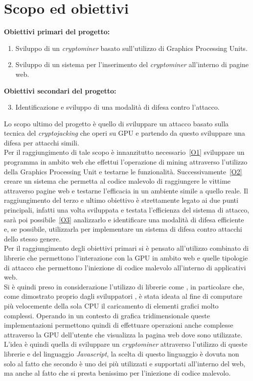 \documentclass[
11pt, %
oneside, %
italian, %
onehalfspacing,%
headsepline, %
]{MastersDoctoralThesis} %
\newcommand\citen[1]{\citeauthor{#1} \citep{#1}}
\begin{document}
{\chapter{Scopo ed obiettivi}}
\textbf{Obiettivi primari del progetto:}
\begin{enumerate}[label= (\roman*)]
        \item\label{O1} Sviluppo di un \emph{cryptominer} basato sull'utilizzo di Graphics Processing Units.
        \item\label{O2} Sviluppo di un sistema per l'inserimento del \emph{cryptominer} all'interno di pagine web.
\end{enumerate}
\textbf{Obiettivi secondari del progetto:}
\begin{enumerate}[label= (\roman*)]
        \setcounter{enumi}{2}
        \item\label{O3} Identificazione e sviluppo di una modalità di difesa contro l'attacco.
\end{enumerate}
Lo scopo ultimo del progetto è quello di sviluppare un attacco basato sulla tecnica del \emph{cryptojacking} che operi su GPU e partendo da questo sviluppare una difesa per attacchi simili.\\
Per il raggiungimento di tale scopo è innanzitutto necessario~\ref{O1} sviluppare un programma in ambito web che effettui l'operazione di mining attraverso l'utilizzo della Graphics Processing Unit e testarne le funzionalità. Successivamente~\ref{O2} creare un sistema che permetta al codice malevolo di raggiungere le vittime attraverso pagine web e testarne l'efficacia in un ambiente simile a quello reale. Il raggiungimento del terzo e ultimo obiettivo è strettamente legato ai due punti principali, infatti una volta sviluppata e testata l'efficienza del sistema di attacco, sarà poi possibile~\ref{O3} analizzarlo e identificare una modalità di difesa efficiente e, se possibile, utilizzarla per implementare un sistema di difesa contro attacchi dello stesso genere.\\
Per il raggiungimento degli obiettivi primari si è pensato all'utilizzo combinato di librerie che permettono l'interazione con la GPU in ambito web e quelle tipologie di attacco che permettono l'iniezione di codice malevolo all'interno di applicativi web.\\
Si è quindi preso in considerazione l'utilizzo di librerie come , in particolare  che, come dimostrato proprio dagli sviluppatori \citep{banchmarkGPU.js}, è stata ideata al fine di computare più velocemente della sola CPU il caricamento di elementi grafici molto complessi. Operando in un contesto di grafica tridimensionale queste implementazioni permettono quindi di effettuare operazioni anche complesse attraverso la GPU dell'utente che visualizza la pagina web dove sono utilizzate. L'idea è quindi quella di sviluppare un \emph{cryptominer} attraverso l'utilizzo di queste librerie e del linguaggio \emph{Javascript}, la scelta di questo linguaggio è dovuta non solo al fatto che secondo \citen{w3techsJavascriptPopularity} è uno dei più utilizzati e supportati all'interno del web, ma anche al fatto che si presta benissimo per l'iniezione di codice malevolo.\\
\end{document}
